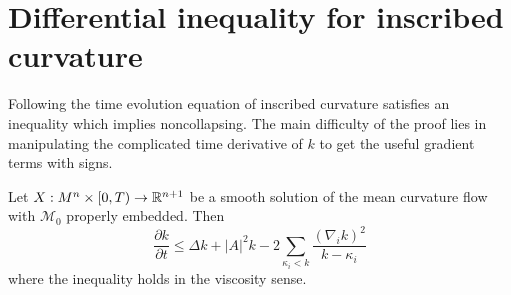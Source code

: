 \section{Differential inequality for inscribed curvature}

Following \cite{andrews2022extrinsic,brendle2015sharp} the time evolution equation of inscribed curvature satisfies an inequality which implies noncollapsing. The main difficulty of the proof lies in manipulating the complicated time derivative of $ k $ to get the useful gradient terms with signs. 

\begin{thm}\label{gradnoncollapsing}
    Let $ X : M^{n} \times [0,T) \to \mathbb{R}^{n+1} $ be a smooth solution of the mean curvature flow with $ \mathcal{M}_{0} $ properly embedded. Then \begin{equation}
        \frac{\partial k}{ \partial t} \le \Delta k + |A|^{2}k -2 \sum_{\kappa_{i}<k} \frac{(\nabla_{i}k)^{2}}{k- \kappa_{i}} \label{gradientnoncollapsing}
    \end{equation}
    where the inequality holds in the viscosity sense. 
\end{thm}
\begin{comment}
    Before that, we will show that  
\begin{lemma}
    The inscribed curvature satisfies 
    \[ k(x) \ge \lim_{y \to x} \sup k(x,y) = \kappa_{n}(x) \]
    where $ \kappa_{1} \le \ldots \le \kappa_{n} $ denotes the principal curvatures of $ \mathcal{M} $. 
\end{lemma}
\end{comment}

